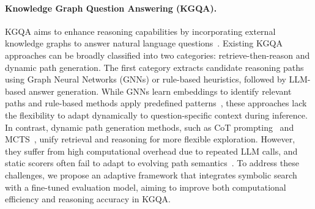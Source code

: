 
\paragraph{Knowledge Graph Question Answering (KGQA).} KGQA aims to enhance reasoning capabilities by incorporating external knowledge graphs to answer natural language questions~\citep{choi2023nutrea, xu2025memory}. Existing KGQA approaches can be broadly classified into two categories: retrieve-then-reason and dynamic path generation. The first category extracts candidate reasoning paths using Graph Neural Networks (GNNs)\citep{ma2025debate, yao2025learning} or rule-based heuristics\citep{fang2024karpa}, followed by LLM-based answer generation. While GNNs learn embeddings to identify relevant paths and rule-based methods apply predefined patterns~\citep{zhao2023divknowqa, liu2025dual}, these approaches lack the flexibility to adapt dynamically to question-specific context during inference. 
In contrast, dynamic path generation methods, such as CoT prompting~\citep{sui2024fidelis, li2024framework} and MCTS~\citep{ma2025deliberation, shen2025reasoning}, unify retrieval and reasoning for more flexible exploration. However, they suffer from high computational overhead due to repeated LLM calls, and static scorers often fail to adapt to evolving path semantics~\citep{long2025enhancing, luo2025kbqa,ma2024think}. To address these challenges, we propose an adaptive framework that integrates symbolic search with a fine-tuned evaluation model, aiming to improve both computational efficiency and reasoning accuracy in KGQA.


